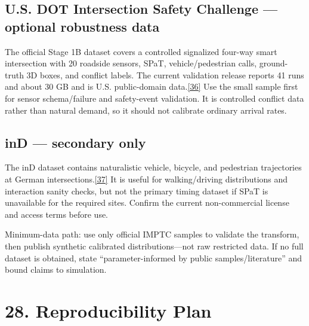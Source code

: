 \documentclass[
  english,
  11pt,
  a4paper,
]{article}
\begin{document}
\subsection{U.S. DOT Intersection Safety Challenge --- optional
robustness
data}\label{u.s.-dot-intersection-safety-challenge-optional-robustness-data}

The official Stage 1B dataset covers a controlled signalized four-way
smart intersection with 20 roadside sensors, SPaT, vehicle/pedestrian
calls, ground-truth 3D boxes, and conflict labels. The current
validation release reports 41 runs and about 30 GB and is U.S.
public-domain data.\hyperref[source-36]{[36]} Use the small sample first
for sensor schema/failure and safety-event validation. It is controlled
conflict data rather than natural demand, so it should not calibrate
ordinary arrival rates.

\subsection{inD --- secondary only}\label{ind-secondary-only}

The inD dataset contains naturalistic vehicle, bicycle, and pedestrian
trajectories at German intersections.\hyperref[source-37]{[37]} It is
useful for walking/driving distributions and interaction sanity checks,
but not the primary timing dataset if SPaT is unavailable for the
required sites. Confirm the current non-commercial license and access
terms before use.

Minimum-data path: use only official IMPTC samples to validate the
transform, then publish synthetic calibrated distributions---not raw
restricted data. If no full dataset is obtained, state
``parameter-informed by public samples/literature'' and bound claims to
simulation.

\section{28. Reproducibility Plan}\label{reproducibility-plan}
\end{document}
